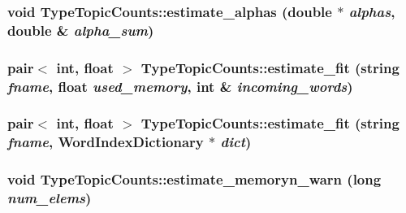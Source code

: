 \label{class_type_topic_counts_aca203c070ed5c7338ebfe7b2b2574ae4}
\hypertarget{class_type_topic_counts_af81d800d17306cb9f53e5bfe0ba49094}{
\subsubsection[{estimate\_\-alphas}]{\setlength{\rightskip}{0pt plus 5cm}void TypeTopicCounts::estimate\_\-alphas (double $\ast$ {\em alphas}, \/  double \& {\em alpha\_\-sum})}}
\label{class_type_topic_counts_af81d800d17306cb9f53e5bfe0ba49094}
\hypertarget{class_type_topic_counts_ae32981836e13dd9a54bfd79224063a12}{
\subsubsection[{estimate\_\-fit}]{\setlength{\rightskip}{0pt plus 5cm}pair$<$ int, float $>$ TypeTopicCounts::estimate\_\-fit (string {\em fname}, \/  float {\em used\_\-memory}, \/  int \& {\em incoming\_\-words})}}
\label{class_type_topic_counts_ae32981836e13dd9a54bfd79224063a12}
\hypertarget{class_type_topic_counts_a050a1b09ad130d2ac048511df424e53b}{
\subsubsection[{estimate\_\-fit}]{\setlength{\rightskip}{0pt plus 5cm}pair$<$ int, float $>$ TypeTopicCounts::estimate\_\-fit (string {\em fname}, \/  {\bf WordIndexDictionary} $\ast$ {\em dict})}}
\label{class_type_topic_counts_a050a1b09ad130d2ac048511df424e53b}
\hypertarget{class_type_topic_counts_ab69a6701ed9e110f9c5ac25e933899ec}{
\subsubsection[{estimate\_\-memoryn\_\-warn}]{\setlength{\rightskip}{0pt plus 5cm}void TypeTopicCounts::estimate\_\-memoryn\_\-warn (long {\em num\_\-elems})}}

